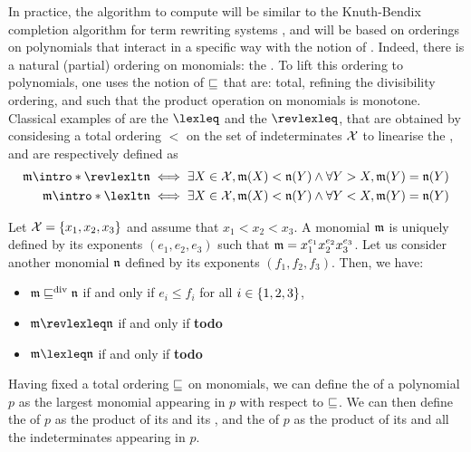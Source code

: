 \AP In practice, the algorithm to compute  will be similar to
the Knuth-Bendix completion algorithm for term rewriting systems
\cite{KNBEND70}, and will be based on orderings on polynomials that interact in
a specific way with the notion of . Indeed, there is a natural
(partial) ordering on monomials: the . To lift this
ordering to polynomials, one uses the notion of 
$\sqsubseteq$ that are: total, refining the divisibility ordering, and such that the
product operation on monomials is monotone.
Classical examples of  are the 
 $\lexleq$ and the  $\revlexleq$, 
that are obtained by considesing a total ordering $<$ on the set of indeterminates
$\mathcal{X}$ to linearise the , and are respectively defined as
\begin{align*}
  \monelt \intro*\revlexlt \monelt[n] & \iff \exists X \in \Indets, \monelt(X) < \monelt[n](Y) 
    \land
    \forall Y > X, \monelt(Y) = \monelt[n](Y) \\
    \monelt \intro*\lexlt \monelt[n] & \iff \exists X \in \Indets, \monelt(X) < \monelt[n](Y)
    \land
    \forall Y < X, \monelt(Y) = \monelt[n](Y) \\
  \end{align*}

\begin{example}
  Let $\mathcal{X} = \{ x_1, x_2, x_3 \}$ and assume that $x_1 < x_2 < x_3$.
  A monomial $\monelt$ is uniquely defined by its exponents $(e_1, e_2, e_3)$
  such that $\monelt = x_1^{e_1} x_2^{e_2} x_3^{e_3}$.
  Let us consider another monomial $\monelt[n]$ defined by its exponents $(f_1, f_2, f_3)$.
  Then, we have:
  \begin{itemize}
    \item $\monelt \divleq \monelt[n]$ if and only if 
      $e_i \leq f_i$ for all $i \in \{ 1,2,3 \}$,
    \item $\monelt \revlexleq \monelt[n]$ if and only if
      \textbf{todo}
    \item $\monelt \lexleq \monelt[n]$ if and only if
      \textbf{todo}
  \end{itemize}
\end{example}

\AP Having fixed a total ordering $\sqsubseteq$ on monomials, we can define the
 of a polynomial $p$ as the largest monomial appearing
in $p$ with respect to $\sqsubseteq$. We can then define the 
of $p$ as the product of its  and its , and the  of $p$ as the product of
its  and all the indeterminates appearing in $p$.

